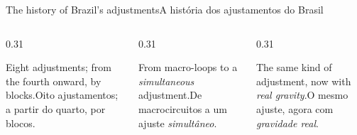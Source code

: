 \documentclass[aspectratio=169,11pt]{beamer}
\newcommand{\tr}[2]{\ifEN#2\else#1\fi}
\begin{document}
\begin{frame}{\tr{A história dos ajustamentos do Brasil}{The history of Brazil's adjustments}}
  \begin{columns}[T]
    \begin{column}{0.31\textwidth}
      \begin{cuidado}[title={\tr{Até 1975}{Up to 1975}}]
        \footnotesize\tr{Oito ajustamentos; a partir do quarto, por blocos.}{Eight adjustments;
        from the fourth onward, by blocks.}
      \end{cuidado}
    \end{column}
    \begin{column}{0.31\textwidth}
      \begin{regra}[title={\tr{1991--2011}{1991--2011}}]
        \footnotesize\tr{De macrocircuitos a um ajuste \emph{simultâneo}.}{From macro-loops to a
        \emph{simultaneous} adjustment.}
      \end{regra}
    \end{column}
    \begin{column}{0.31\textwidth}
      \begin{ideia}[title={\tr{2018}{2018}}]
        \footnotesize\tr{O mesmo ajuste, agora com \emph{gravidade real}.}{The same kind of
        adjustment, now with \emph{real gravity}.}
      \end{ideia}
    \end{column}
  \end{columns}
\end{frame}
\end{document}
